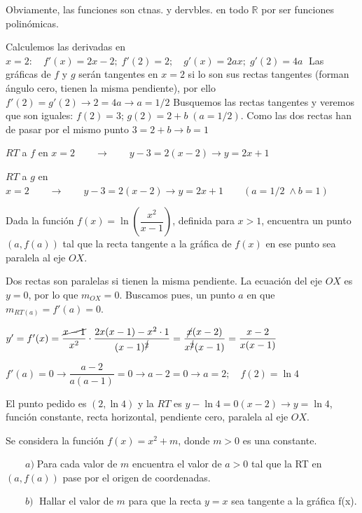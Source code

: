 	\begin{proofw}\renewcommand{\qedsymbol}{$\diamond$}
	
	Obviamente, las funciones son ctnas. y dervbles. en todo $\mathbb R$ por ser funciones polinómicas.
	
	Calculemos las derivadas en $x=2:\quad f'(x)=2x-2;\; f'(2)=2; \quad g'(x)=2ax; \; g'(2)=4a\; $ Las gráficas de $f$ y $g$ serán tangentes en $x=2$ si lo son sus rectas tangentes (forman ángulo cero, tienen la misma pendiente), por ello $f'(2)=g'(2) \to 2=4a \to a=1/2$
	Busquemos las rectas tangentes y veremos que son iguales: $f(2)=3$; $g(2)=2+b\; (a=1/2)$. Como las dos rectas han de pasar por el mismo punto $3=2+b \to b=1$
	
	$RT$ a $f$ en $x=2\qquad \to \qquad y-3=2(x-2) \to y=2x+1$
	
	$RT$ a $g$ en $x=2\qquad \to \qquad y-3=2(x-2) \to y=2x+1 \qquad (a=1/2 \; \wedge b=1)$
	
	\end{proofw}
	
	\begin{ejre}
	Dada la función $f(x)=\ln \left( \dfrac {x^2}{x-1} \right)$, definida para $x>1$, encuentra un punto $(a,f(a))$ tal que la recta tangente a la gráfica de $f(x)$ en ese punto sea paralela al eje $OX$.	
	\end{ejre}
	
	\begin{proofw}\renewcommand{\qedsymbol}{$\diamond$}

		Dos rectas son paralelas si tienen la misma pendiente. La ecuación del eje $OX$ es $y=0$, por lo que $m_{OX}=0$. Buscamos pues, un punto $a$ en que $m_{RT(a)}=f'(a)=0$.
		
		$y'=f'(x)= \dfrac {\cancel{x-1}}{x^2} \cdot \dfrac {2x(x-1)-x^2\cdot 1}{(x-1)^{\cancel{2}}}=\dfrac {\cancel{x}(x-2)}{x^{\cancel{2}}(x-1)}=\dfrac {x-2}{x(x-1)}$
		
		$f'(a)=0 \to \dfrac {a-2}{a(a-1)}=0 \to a-2=0 \to a=2; \quad f(2)=\ln 4$
		
		El punto pedido es $(2,\ln4)$ y la $RT$ es $y-	\ln4=0(x-2) \to y=\ln4$, función constante, recta horizontal, pendiente cero, paralela al eje $OX$.
		
	\end{proofw}

	\begin{ejre}
		Se considera la función $f(x)=x^2+m$, donde $m>0$ es una constante.
		
		$\qquad a) \; $Para cada valor de $m$ encuentra el valor de $a>0$ tal que la RT en $(a,f(a))$ pase por el origen de coordenadas.
		
		$\qquad b) \; $ Hallar el valor de $m$ para que la recta $y=x$ sea tangente a la gráfica f(x).
	\end{ejre}
	
